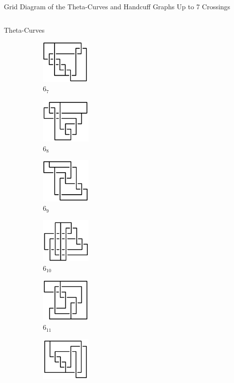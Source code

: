 \documentclass[final]{beamer}
\begin{document}
\begin{frame}[t]
\begin{alertblock}{Grid Diagram of the Theta-Curves and Handcuff Graphs Up to 7 Crossings}
\begin{columns}[t]
\begin{column}{0.7\textwidth}
\begin{alertblock}{Theta-Curves}
\begin{figure}
\begin{subfigure}{0.075\textwidth}
    \includegraphics[width=2.5cm]{../Midterm_Poster/grid_diagram/theta_6_7.png}
    \caption{$6_7$} 
    \end{subfigure}
      \begin{subfigure}{0.075\textwidth}
    \includegraphics[width=2.5cm]{../Midterm_Poster/grid_diagram/theta_6_8.png}
    \caption{$6_8$} 
    \end{subfigure}
    \begin{subfigure}{0.075\textwidth}
    \includegraphics[width=2.5cm]{../Midterm_Poster/grid_diagram/theta_6_9.png}
    \caption{$6_9$} 
    \end{subfigure}
    \begin{subfigure}{0.075\textwidth}
    \includegraphics[width=2.5cm]{../Midterm_Poster/grid_diagram/theta_6_10.png}
    \caption{$6_{10}$} 
    \end{subfigure}
    \begin{subfigure}{0.075\textwidth}
    \includegraphics[width=2.5cm]{../Midterm_Poster/grid_diagram/theta_6_11.png}
    \caption{$6_{11}$} 
    \end{subfigure}
    \begin{subfigure}{0.075\textwidth}
    \includegraphics[width=2.5cm]{../Midterm_Poster/grid_diagram/theta_6_12.png}

\end{subfigure}
\end{figure}
\end{alertblock}
\end{column}
\end{columns}
\end{alertblock}
\end{frame}
\end{document}
